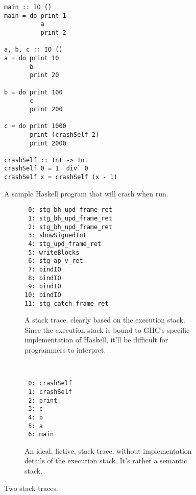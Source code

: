 \begin{figure}
\begin{mdframed}
  \begin{verbatim}
main :: IO ()
main = do print 1
          a
          print 2

a, b, c :: IO ()
a = do print 10
       b
       print 20

b = do print 100
       c
       print 200

c = do print 1000
       print (crashSelf 2)
       print 2000

crashSelf :: Int -> Int
crashSelf 0 = 1 `div` 0
crashSelf x = crashSelf (x - 1)
  \end{verbatim}
  \caption{A sample Haskell program that will crash when run.}
  \label{fig:sample_program}
\end{mdframed}
\end{figure}




\begin{figure}
\begin{mdframed}
  \begin{subfigure}[t]{0.5\textwidth}
    {\small
    \begin{verbatim}
 0: stg_bh_upd_frame_ret
 1: stg_bh_upd_frame_ret
 2: stg_bh_upd_frame_ret
 3: showSignedInt
 4: stg_upd_frame_ret
 5: writeBlocks
 6: stg_ap_v_ret
 7: bindIO
 8: bindIO
 9: bindIO
10: bindIO
11: stg_catch_frame_ret
    \end{verbatim}
  }%
    \caption{A stack trace, clearly based on the execution stack. Since the
      execution stack is bound to GHC's specific implementation of Haskell,
      it'll be difficult for programmers to interpret.}
    \label{fig:trace_goal1}
  \end{subfigure}
        ~ %
        \begin{subfigure}[t]{0.5\textwidth}
    {\small
          \begin{verbatim}
 0: crashSelf
 1: crashSelf
 2: print
 3: c
 4: b
 5: a
 6: main
          \end{verbatim}
  }%
          \caption{An ideal, fictive, stack trace, without
          implementation details of the execution stack. It's rather a
          semantic stack.}
          \label{fig:trace_goal2}
        \end{subfigure}
        \caption{Two stack traces.}
        \label{fig:traces}
\end{mdframed}
\end{figure}

